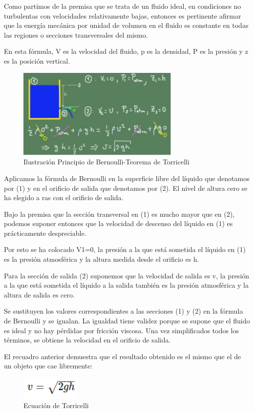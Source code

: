 \documentclass[journal,transmag]{IEEEtran}
\begin{document}
Como partimos de la premisa que se trata de un fluido ideal, en condiciones no turbulentas con velocidades relativamente bajas, entonces es pertinente afirmar que la energía mecánica por unidad de volumen en el fluido es constante en todas las regiones o secciones transversales del mismo. 

En esta fórmula, V es la velocidad del fluido, p es la densidad, P es la presión y z es la posición vertical.
 
 \begin{figure}[!h]
\center
\includegraphics[width=8cm]{imagen14.png}
\caption{Ilustración Principio de Bernoulli-Teorema de Torricelli}
\label{f7}
\end{figure}
 
 Aplicamos la fórmula de Bernoulli en la superficie libre del líquido que denotamos por (1) y en el orificio de salida que denotamos por (2). El nivel de altura cero se ha elegido a ras con el orificio de salida. 

Bajo la premisa que la sección transversal en (1) es mucho mayor que en (2), podemos suponer entonces que la velocidad de descenso del líquido en (1) es prácticamente despreciable. 

Por esto se ha colocado V1=0, la presión a la que está sometida el líquido en (1) es la presión atmosférica y la altura medida desde el orificio es h. 

Para la sección de salida (2) suponemos que la velocidad de salida es v, la presión a la que está sometida el líquido a la salida también es la presión atmosférica y la altura de salida es cero. 

Se sustituyen los valores correspondientes a las secciones (1) y (2) en la fórmula de Bernoulli y se igualan. 
La igualdad tiene validez porque se supone que el fluido es ideal y no hay pérdidas por fricción viscosa. Una vez simplificados todos los términos, se obtiene la velocidad en el orificio de salida. 

El recuadro anterior demuestra que el resultado obtenido es el mismo que el de un objeto que cae libremente:
  \begin{figure}[!h]
\center
\includegraphics[width=3cm]{imagen9.png}
\caption{Ecuación de Torricelli}
\label{f7}
\end{figure} 
\end{document}
